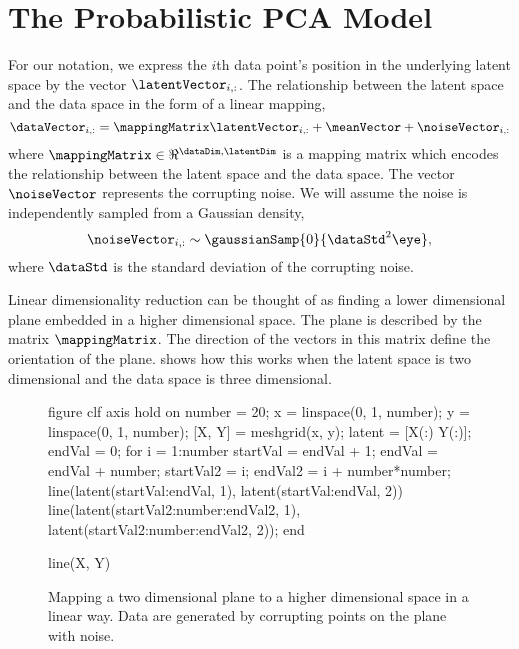\section{The Probabilistic PCA Model}

For our notation, we express the $i$th data point's position in the
underlying latent space by the vector $\latentVector_{i, :}$. The
relationship between the latent space and the data space in the form
of a linear mapping,
\[
\dataVector_{i, :} = \mappingMatrix \latentVector_{i, :} + \meanVector
+ \noiseVector_{i, :}
\]
where $\mappingMatrix \in \Re^{\dataDim,\latentDim}$ is a mapping
matrix which encodes the relationship between the latent space and the
data space. The vector $\noiseVector$ represents the corrupting
noise. We will assume the noise is independently sampled from a
Gaussian density,
\[
\noiseVector_{i,:} \sim \gaussianSamp{0}{\dataStd^2\eye},
\]
where $\dataStd$ is the standard deviation of the corrupting noise. 

Linear dimensionality reduction can be thought of as finding a lower
dimensional plane embedded in a higher dimensional space. The plane is
described by the matrix $\mappingMatrix$. The direction of the vectors
in this matrix define the orientation of the
plane.  shows how this works when
the latent space is two dimensional and the data space is three
dimensional.
\begin{figure}
  \begin{matlab}
    figure
    clf
    axis
    hold on
    number = 20;
    x = linspace(0, 1, number);
    y = linspace(0, 1, number);
    [X, Y] = meshgrid(x, y);
    latent = [X(:) Y(:)];
    endVal = 0;
    for i = 1:number
      startVal = endVal + 1;
      endVal = endVal + number;
      startVal2 = i;
      endVal2 = i + number*number;
      line(latent(startVal:endVal, 1), latent(startVal:endVal, 2))
      line(latent(startVal2:number:endVal2, 1), latent(startVal2:number:endVal2, 2));
    end
    
    line(X, Y)
  \end{matlab}
  \begin{center}
  \end{center}
  
  \caption{Mapping a two dimensional plane to a higher dimensional
    space in a linear way. Data are generated by corrupting points on
    the plane with noise.}\label{fig:mapping2to3linear}
  
\end{figure}

